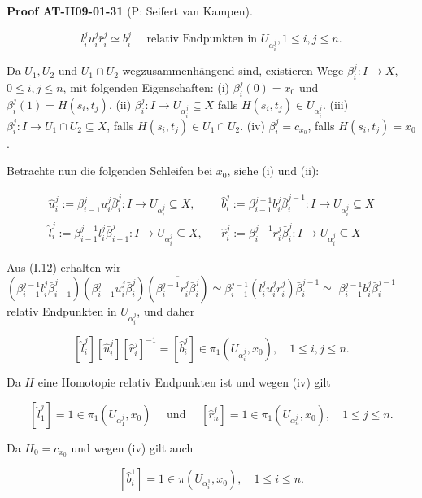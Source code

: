 \documentclass[10pt, letterpaper]{article}
\newcommand{\CustomHeading}[3]{%
  \par\medskip\noindent%
  \textbf{#1 #2} \textnormal{(#3)}.\enskip%
}
\newenvironment{PROOF}[2]{\begin{unitbox}\CustomHeading{Proof}{#1}{#2}}{\end{unitbox}}
\begin{document}
\begin{PROOF}{AT-H09-01-31}{P: Seifert van Kampen}
$$
l_i^j u_i^j \bar{r}_i^j \simeq b_i^j \quad \text { relativ Endpunkten in } U_{\alpha_i^j}, 1 \leq i, j \leq n .
$$


Da $U_1, U_2$ und $U_1 \cap U_2$ wegzusammenhängend sind, existieren Wege $\beta_i^j: I \rightarrow X$, $0 \leq i, j \leq n$, mit folgenden Eigenschaften:
(i) $\beta_i^j(0)=x_0$ und $\beta_i^j(1)=H\left(s_i, t_j\right)$.
(ii) $\beta_i^j: I \rightarrow U_{\alpha_i^j} \subseteq X$ falls $H\left(s_i, t_j\right) \in U_{\alpha_i^j}$.
(iii) $\beta_i^j: I \rightarrow U_1 \cap U_2 \subseteq X$, falls $H\left(s_i, t_j\right) \in U_1 \cap U_2$.
(iv) $\beta_i^j=c_{x_0}$, falls $H\left(s_i, t_j\right)=x_0$.

Betrachte nun die folgenden Schleifen bei $x_0$, siehe (i) und (ii):

$$
\begin{aligned}
\hat{u}_i^j:=\beta_{i-1}^j u_i^j \bar{\beta}_i^j: I \rightarrow U_{\alpha_i^j} \subseteq X, & & \hat{b}_i^j:=\beta_{i-1}^{j-1} b_i^j \bar{\beta}_i^{j-1}: I \rightarrow U_{\alpha_i^j} \subseteq X \\
\hat{l}_i^j:=\beta_{i-1}^{j-1} l_i^j \bar{\beta}_{i-1}^j: I \rightarrow U_{\alpha_i^j} \subseteq X, & & \hat{r}_i^j:=\beta_i^{j-1} r_i^j \bar{\beta}_i^j: I \rightarrow U_{\alpha_i^j} \subseteq X
\end{aligned}
$$


Aus (I.12) erhalten wir $\left(\beta_{i-1}^{j-1} l_i^j \bar{\beta}_{i-1}^j\right)\left(\beta_{i-1}^j u_i^j \bar{\beta}_i^j\right)\left(\overline{\beta_i^{j-1} r_i^j \bar{\beta}_i^j}\right) \simeq \beta_{i-1}^{j-1}\left(l_i^j u_i^j \bar{r}_i^j\right) \bar{\beta}_i^{j-1} \simeq$ $\beta_{i-1}^{j-1} b_i^j \bar{\beta}_i^{j-1}$ relativ Endpunkten in $U_{\alpha_i^j}$, und daher

$$
\left[\hat{l}_i^j\right]\left[\hat{u}_i^j\right]\left[\hat{r}_i^j\right]^{-1}=\left[\hat{b}_i^j\right] \in \pi_1\left(U_{\alpha_i^j}, x_0\right), \quad 1 \leq i, j \leq n .
$$


Da $H$ eine Homotopie relativ Endpunkten ist und wegen (iv) gilt

$$
\left[\hat{l}_1^j\right]=1 \in \pi_1\left(U_{\alpha_1^j}, x_0\right) \quad \text { und } \quad\left[\hat{r}_n^j\right]=1 \in \pi_1\left(U_{\alpha_n^j}, x_0\right), \quad 1 \leq j \leq n .
$$


Da $H_0=c_{x_0}$ und wegen (iv) gilt auch

$$
\left[\hat{b}_i^1\right]=1 \in \pi\left(U_{\alpha_i^1}, x_0\right), \quad 1 \leq i \leq n .
$$



\end{PROOF}
\end{document}

